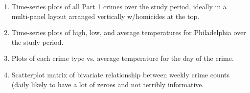 \documentclass{article}\usepackage[]{graphicx}\usepackage[]{color}
\begin{document}
\begin{enumerate}

\item Time-series plots of all Part 1 crimes over the study period, ideally in a multi-panel layout arranged vertically w/homicides at the top.

\item Time-series plots of high, low, and average temperatures for Philadelphia over the study period.

\item Plots of each crime type vs. average temperature for the day of the crime.

\item Scatterplot matrix of bivariate relationship between weekly crime counts (daily likely to have a lot of zeroes and not terribly informative.

\end{enumerate}
\end{document}
